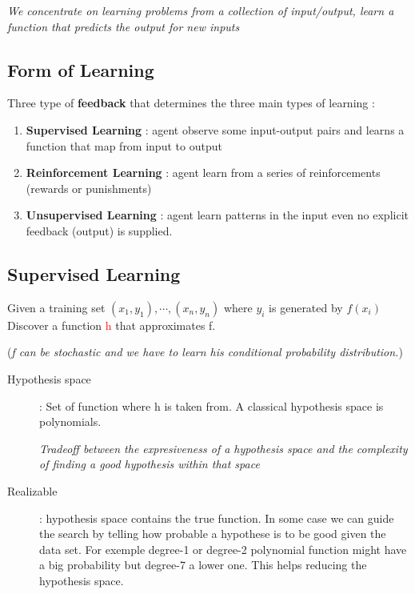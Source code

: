 \textit{We concentrate on learning problems from a collection of input/output,
learn a function that predicts the output for new inputs}

\subsection{Form of Learning}

Three type of \textbf{feedback} that determines the three main types of learning :
\begin{enumerate}
    \item \textbf{Supervised Learning} : agent observe some input-output pairs and learns
        a function that map from input to output
    \item \textbf{Reinforcement Learning} : agent learn from a series of reinforcements
        (rewards or punishments)
    \item \textbf{Unsupervised Learning} : agent learn patterns in the input
        even no explicit feedback (output) is supplied.
\end{enumerate}

\subsection{Supervised Learning}

Given a training set $(x_1, y_1),\cdots, (x_n, y_n)$ where $y_i$ is generated by $f(x_i)$
Discover a function \textcolor{red}{h} that approximates f.

(\textit{f can be stochastic and we have to learn his conditional probability distribution.})

\begin{description}
    \item[Hypothesis space] : Set of function where h is taken from. A classical 
        hypothesis space is polynomials.

        \textit{Tradeoff between the expresiveness of a hypothesis space and the
        complexity of finding a good hypothesis within that space}
    \item[Realizable] : hypothesis space contains the true function.
    In some case we can guide the search by telling how probable a hypothese is to be good given the data set. For exemple degree-1 or degree-2 polynomial function might have a big probability but degree-7 a lower one. This helps reducing the hypothesis space.
 \end{description}

